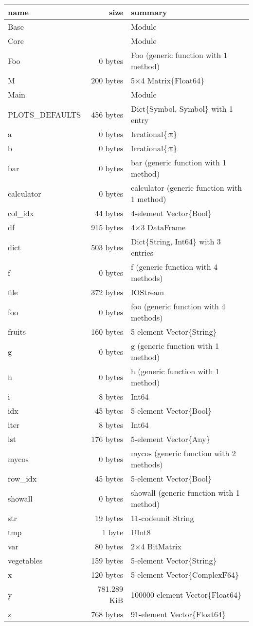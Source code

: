 \documentclass[11pt]{article}
\begin{document}
    \begin{tabular}
{l | r | l}
name & size & summary \\
\hline
Base &  & Module \\
Core &  & Module \\
Foo & 0 bytes & Foo (generic function with 1 method) \\
M & 200 bytes & 5×4 Matrix\{Float64\} \\
Main &  & Module \\
PLOTS\_DEFAULTS & 456 bytes & Dict\{Symbol, Symbol\} with 1 entry \\
a & 0 bytes & Irrational\{:π\} \\
b & 0 bytes & Irrational\{:π\} \\
bar & 0 bytes & bar (generic function with 1 method) \\
calculator & 0 bytes & calculator (generic function with 1 method) \\
col\_idx & 44 bytes & 4-element Vector\{Bool\} \\
df & 915 bytes & 4×3 DataFrame \\
dict & 503 bytes & Dict\{String, Int64\} with 3 entries \\
f & 0 bytes & f (generic function with 4 methods) \\
file & 372 bytes & IOStream \\
foo & 0 bytes & foo (generic function with 4 methods) \\
fruits & 160 bytes & 5-element Vector\{String\} \\
g & 0 bytes & g (generic function with 1 method) \\
h & 0 bytes & h (generic function with 1 method) \\
i & 8 bytes & Int64 \\
idx & 45 bytes & 5-element Vector\{Bool\} \\
iter & 8 bytes & Int64 \\
lst & 176 bytes & 5-element Vector\{Any\} \\
mycos & 0 bytes & mycos (generic function with 2 methods) \\
row\_idx & 45 bytes & 5-element Vector\{Bool\} \\
showall & 0 bytes & showall (generic function with 1 method) \\
str & 19 bytes & 11-codeunit String \\
tmp & 1 byte & UInt8 \\
var & 80 bytes & 2×4 BitMatrix \\
vegetables & 159 bytes & 5-element Vector\{String\} \\
x & 120 bytes & 5-element Vector\{ComplexF64\} \\
y & 781.289 KiB & 100000-element Vector\{Float64\} \\
z & 768 bytes & 91-element Vector\{Float64\} \\
\end{tabular}
\end{document}
